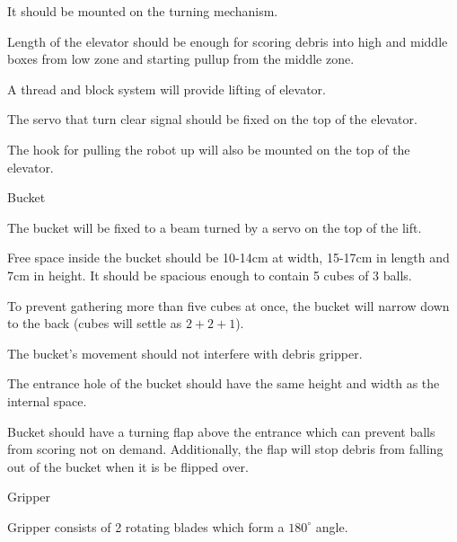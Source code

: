 \begin{enumerate*}
\begin{enumerate*}
  		\item It should be mounted on the turning mechanism.
  		
  		\item Length of the elevator should be enough for scoring debris into high and middle boxes from low zone and starting pullup from the middle zone. 
  		
  		\item A thread and block system will provide lifting of elevator.
  		
  		\item The servo that turn clear signal should be fixed on the top of the elevator.
  		
  		\item The hook for pulling the robot up will also be mounted on the top of the elevator.
  		
  	\end{enumerate*}
  	
  	\item Bucket
  	\begin{enumerate*}
  		
  		\item The bucket will be fixed to a beam turned by a servo on the top of the lift.
  		
  		\item Free space inside the bucket should be 10-14cm at width, 15-17cm in length and 7cm in height. It should be spacious enough to contain 5 cubes of 3 balls.
  		
  		\item To prevent gathering more than five cubes at once, the bucket will narrow down to the back (cubes will settle as $2+2+1$). 
  		
  		\item The bucket's movement should not interfere with debris gripper.
  		
  		
  		\item The entrance hole of the bucket should have the same height and width as the internal space.
  		
  		\item Bucket should have a turning flap above the entrance which can prevent balls from scoring not on demand. Additionally, the flap will stop debris from falling out of the bucket when it is be flipped over.
  	\end{enumerate*}
  	
  	\item Gripper
  	\begin{enumerate*}
  		\item Gripper consists of 2 rotating blades which form a $180^{\circ}$ angle.
  		

\end{enumerate*}
\end{enumerate*}
